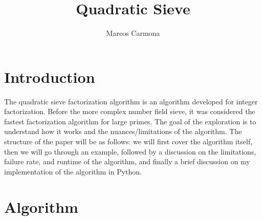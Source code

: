 \documentclass[11pt,reqno]{amsart}
\title{Quadratic Sieve}
\author[M. Carmona]{Marcos Carmona}
\theoremstyle{definition}
\newtheorem{definition}[theorem]{Definition}
\begin{document}
\maketitle
\setcounter{tocdepth}{1}

\section{Introduction}
The quadratic sieve factorization algorithm is an algorithm developed for integer factorization. Before the more complex number field sieve, it was considered the fastest factorization algorithm for large primes. The goal of the exploration is to understand how it works and the nuances/limitations of the algorithm. The structure of the paper will be as follows: we will first cover the algorithm itself, then we will go through an example, followed by a discussion on the limitations, failure rate, and runtime of the algorithm, and finally a brief discussion on my implementation of the algorithm in Python.






\section{Algorithm}
\label{sec:algorithm}
\setcounter{algorithm}{0}
\end{document}
